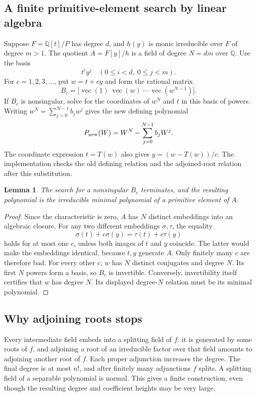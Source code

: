 \documentclass[11pt,a4paper]{article}
\newtheorem{lemma}[theorem]{Lemma}
\theoremstyle{definition}
\theoremstyle{remark}
\newcommand{\Q}{\mathbb Q}
\begin{document}
\subsection{A finite primitive-element search by linear algebra}
Suppose $F=\Q[t]/P$ has degree $d$, and $h(y)$ is monic irreducible over $F$ of
degree $m>1$. The quotient $A=F[y]/h$ is a field of degree $N=dm$ over $\Q$.
Use the basis
\[
 t^iy^j\quad(0\leq i<d,\ 0\leq j<m).
\]
For $c=1,2,3,\ldots$, put $w=t+cy$ and form the rational matrix
\begin{equation}\label{eq:primitive-matrix}
 B_c=\bigl[\operatorname{vec}(1)\ \operatorname{vec}(w)\ \cdots\
             \operatorname{vec}(w^{N-1})\bigr].
\end{equation}
If $B_c$ is nonsingular, solve for the coordinates of $w^N$ and $t$ in this
basis of powers. Writing $w^N=\sum_{j=0}^{N-1}b_jw^j$ gives the new defining
polynomial
\[
 P_{\rm new}(W)=W^N-\sum_{j=0}^{N-1}b_jW^j.
\]
The coordinate expression $t=T(w)$ also gives $y=(w-T(w))/c$. The implementation
checks the old defining relation and the adjoined-root relation after this
substitution.

\begin{lemma}\label{lem:primitive}
The search for a nonsingular $B_c$ terminates, and the resulting polynomial is
the irreducible minimal polynomial of a primitive element of $A$.
\end{lemma}
\begin{proof}
Since the characteristic is zero, $A$ has $N$ distinct embeddings into an
algebraic closure. For any two different embeddings $\sigma,\tau$, the equality
\[
 \sigma(t)+c\sigma(y)=\tau(t)+c\tau(y)
\]
holds for at most one $c$, unless both images of $t$ and $y$ coincide. The
latter would make the embeddings identical, because $t,y$ generate $A$.
Only finitely many $c$ are therefore bad. For every other $c$, $w$ has $N$
distinct conjugates and degree $N$. Its first $N$ powers form a basis, so
$B_c$ is invertible. Conversely, invertibility itself certifies that $w$ has
degree $N$. Its displayed degree-$N$ relation must be its minimal polynomial.
\end{proof}

\subsection{Why adjoining roots stops}
Every intermediate field embeds into a splitting field of $f$: it is generated
by some roots of $f$, and adjoining a root of an irreducible factor over that
field amounts to adjoining another root of $f$. Each proper adjunction
increases the degree. The final degree is at most $n!$, and after finitely many
adjunctions $f$ splits. A splitting field of a separable polynomial is normal.
This gives a finite construction, even though the resulting degree and
coefficient heights may be very large.
\end{document}
